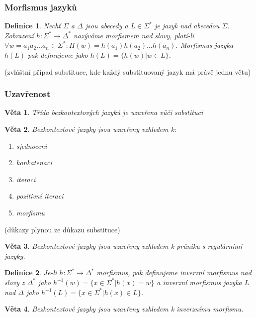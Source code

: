 \documentclass[a4paper, 11pt]{report}
\newtheorem{mydef}{Definice}[chapter]
\newtheorem{veta}{Věta}[chapter]
\begin{document}
\subsubsection{Morfismus jazyků}

\begin{mydef}
Nechť $\Sigma$ a $\Delta$ jsou abecedy a $L \in \Sigma^*$ je jazyk nad abecedou $\Sigma$. Zobrazení $h: \Sigma^* \to \Delta^*$ nazýváme \emph{morfismem nad slovy}, platí-li $\forall w = a_1 a_2 \dots a_n \in \Sigma^* : H(w) = h(a_1) h(a_2) \dots h(a_n)$. \emph{Morfismus jazyka} $h(L)$ pak definujeme jako $h(L) = \{h(w) | w \in L\}$.
\end{mydef}
(zvláštní případ substituce, kde každý substituovaný jazyk má právě jednu větu)

\subsubsection{Uzavřenost}
\begin{veta}
Třída bezkontextových jazyků je uzavřena vůči substituci
\end{veta}

\begin{veta}
Bezkontextové jazyky jsou uzavřeny vzhledem k:
\begin{enumerate}
	\item sjednoceni
	\item konkatenaci
	\item iteraci
	\item pozitivní iteraci
	\item morfismu
\end{enumerate}
\end{veta}
(důkazy plynou ze důkazu substituce)

\begin{veta}
Bezkontextové jazyky jsou uzavřeny vzhledem k průniku s regulárními jazyky.
\end{veta}

\begin{mydef}
Je-li $h: \Sigma^* \to \Delta^*$ morfismus, pak definujeme \emph{inverzní morfismus nad slovy} z $\Delta^*$ jako $h^{-1}(w) = \{x \in \Sigma^* | h(x) = w\}$ a \emph{inverzní morfismus jazyka $L$} nad $\Delta$ jako $h^{-1}(L) = \{x \in \Sigma^* | h(x) \in L\}$.
\end{mydef}

\begin{veta}
Bezkontextové jazyky jsou uzavřeny vzhledem k inverznímu morfismu.
\end{veta}
\end{document}
